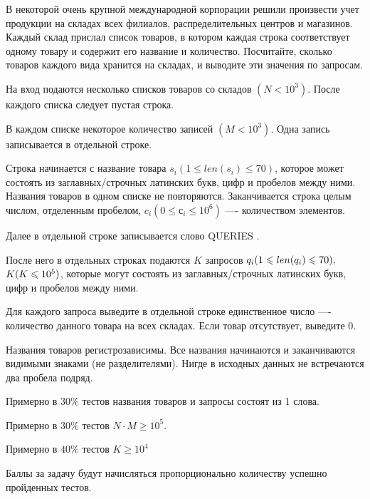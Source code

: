 
В некоторой очень крупной международной корпорации решили произвести учет продукции на складах всех филиалов, распределительных центров и магазинов. Каждый склад прислал список товаров, в котором каждая строка соответствует одному товару и содержит его название и количество. Посчитайте, сколько товаров каждого вида хранится на складах, и выводите эти значения по запросам.


На вход подаются несколько списков товаров со складов $(N < 10^3)$. После каждого списка следует пустая строка.

В каждом списке некоторое количество записей $(M < 10^3)$. Одна запись записывается в отдельной строке.

Строка начинается с название товара $ s_i (1 \leq len(s_i) \leq 70) $, которое может состоять из заглавных/строчных латинских букв, цифр и пробелов между ними. Названия товаров в одном списке не повторяются. Заканчивается строка целым числом, отделенным пробелом, $ c_i (0 \leq с_i \leq 10^6) $ —- количеством элементов. 

Далее в отдельной строке записывается слово QUERIES .

После него в отдельных строках подаются $ K $ запросов $  q_i\space (1 \leq len(q_i) \leq 70),$ \linebreak $K\space (K \leq 10^5 )$, которые могут состоять из заглавных/строчных латинских букв, цифр и пробелов между ними. 

\outputfmtSection

Для каждого запроса выведите в отдельной строке единственное число —- количество данного товара на всех складах. Если товар отсутствует, выведите $ 0 $.

\explanationSection

Названия товаров регистрозависимы. Все названия начинаются и заканчиваются видимыми знаками (не разделителями). Нигде в исходных данных не встречаются два пробела подряд.

\markSection

Примерно в $ 30\% $ тестов названия товаров и запросы состоят из 1 слова. 

Примерно в $ 30\% $ тестов $  N \cdot M \geq 10 ^ 5 $.

Примерно в $ 40\% $ тестов $ K \geq 10^4 $

Баллы за задачу будут начисляться пропорционально количеству успешно пройденных тестов.

